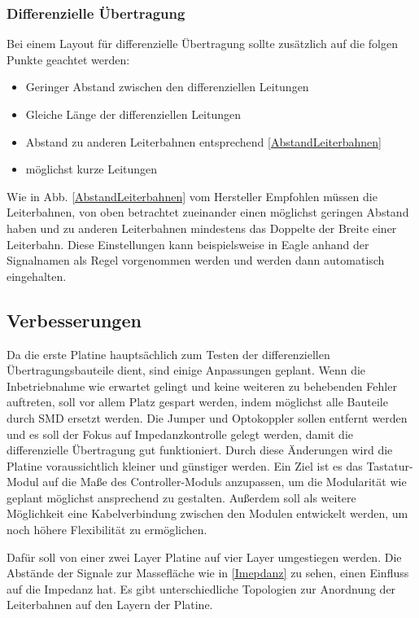 \subsubsection{Differenzielle Übertragung}
Bei einem Layout für differenzielle Übertragung sollte zusätzlich auf die folgen Punkte geachtet werden:


\begin{itemize}
	\item Geringer Abstand zwischen den differenziellen Leitungen
	\item Gleiche Länge der differenziellen Leitungen
	\item Abstand zu anderen Leiterbahnen entsprechend \ref{AbstandLeiterbahnen}
	\item möglichst kurze Leitungen 
\end{itemize}


Wie in Abb. \ref{AbstandLeiterbahnen} vom Hersteller Empfohlen müssen die Leiterbahnen, von oben betrachtet zueinander einen möglichst geringen Abstand haben und zu anderen Leiterbahnen mindestens das Doppelte der Breite einer Leiterbahn. Diese Einstellungen kann beispielsweise in Eagle anhand der Signalnamen als Regel vorgenommen werden und werden dann automatisch eingehalten. 

\subsection{Verbesserungen}
Da die erste Platine hauptsächlich zum Testen der differenziellen Übertragungsbauteile dient, sind einige Anpassungen geplant. \newline
Wenn die Inbetriebnahme wie erwartet gelingt und keine weiteren zu behebenden Fehler auftreten, soll vor allem Platz gespart werden, indem möglichst alle Bauteile durch SMD ersetzt werden. Die Jumper und Optokoppler sollen entfernt werden und es soll der Fokus auf Impedanzkontrolle gelegt werden, damit die differenzielle Übertragung gut funktioniert. \newline
Durch diese Änderungen wird die Platine voraussichtlich kleiner und günstiger werden. Ein Ziel ist es das Tastatur-Modul auf die Maße des Controller-Moduls anzupassen, um die Modularität wie geplant möglichst ansprechend zu gestalten. \newline
Außerdem soll als weitere Möglichkeit eine Kabelverbindung zwischen den Modulen entwickelt werden, um noch höhere Flexibilität zu ermöglichen.

Dafür soll von einer zwei Layer Platine auf vier Layer umgestiegen werden. Die Abstände der Signale zur Massefläche wie in \ref{Imepdanz} zu sehen, einen Einfluss auf die Impedanz hat. Es gibt unterschiedliche Topologien zur Anordnung der Leiterbahnen auf den Layern der Platine.

